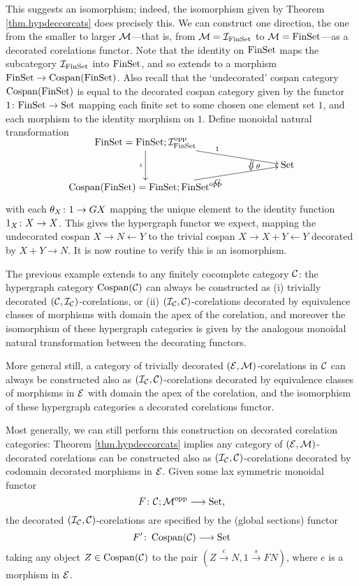 \begin{example}
  This suggests an isomorphism; indeed, the isomorphism given by Theorem
  \ref{thm.hypdeccorcats} does precisely this. We can construct one direction,
  the one from the smaller to larger $\mathcal M$---that is, from $\mathcal M = \mathcal
  I_{\mathrm{FinSet}}$ to $\mathcal M = \mathrm{FinSet}$---as a decorated corelations
  functor.  Note that the identity on $\mathrm{FinSet}$ maps the subcategory $\mathcal
  I_{\mathrm{FinSet}}$ into $\mathrm{FinSet}$, and so extends to a morphism $\mathrm{FinSet} \to
  \operatorname{{Cospan}}(\mathrm{FinSet})$. Also recall that the `undecorated' cospan category
  $\operatorname{{Cospan}}(\mathrm{FinSet})$ is equal to the decorated cospan category given by the
  functor $1{\colon} \mathrm{FinSet} \to \mathrm{Set}$ mapping each finite set to some chosen one
  element set $1$, and each morphism to the identity morphism on $1$. Define
  monoidal natural transformation 
  \[
    \xymatrixrowsep{2ex}
    \xymatrix{
      \FinSet = \FinSet; \mc I_{\FinSet}^\opp \ar[dd]_{\iota} \ar[drr]^1  \\
      &\twocell \omit{_\:\theta}& \Set \\
      \cospan(\FinSet) = \FinSet; \FinSet^\opp \ar[urr]_{G} 
    }
  \]
  with each $\theta_X {\colon} 1 \to GX$ mapping the unique element to the identity
  function $1_X{\colon} X \to X$.  This gives the hypergraph functor we expect,
  mapping the undecorated cospan $X \to N \leftarrow Y$ to the trivial cospan $X
  \to X+Y \leftarrow Y$ decorated by $X+Y \to N$. It is now routine to verify
  this is an isomorphism.
\end{example}

The previous example extends to any finitely cocomplete category $\mathcal C$: the
hypergraph category $\operatorname{{Cospan}}(\mathcal C)$ can always be constructed as (i)
trivially decorated $(\mathcal C, \mathcal I_{\mathcal C})$-corelations, or (ii) $(\mathcal I_{\mathcal
C}, \mathcal C)$-corelations decorated by equivalence classes of morphisms with
domain the apex of the corelation, and moreover the isomorphism of these
hypergraph categories is given by the analogous monoidal natural transformation
between the decorating functors.

More general still, a category of trivially decorated $(\mathcal E, \mathcal
M)$-corelations in $\mathcal C$ can always be constructed also as $(\mathcal I_{\mathcal C},
\mathcal C)$-corelations decorated by equivalence classes of morphisms in $\mathcal E$
with domain the apex of the corelation, and the isomorphism of these
hypergraph categories a decorated corelations functor.

Most generally, we can still perform this construction on decorated corelation
categories: Theorem \ref{thm.hypdeccorcats} implies any category of $(\mathcal E,\mathcal
M)$-decorated corelations can be constructed also as $(\mathcal I_{\mathcal C}, \mathcal
C)$-corelations decorated by codomain decorated morphisms in $\mathcal E$. Given some
lax symmetric monoidal functor
\[
  F{\colon} \mathcal C;\mathcal M^{\mathrm{opp}} \longrightarrow \mathrm{Set},
\]
the decorated $(\mathcal I_{\mathcal C}, \mathcal C)$-corelations are specified by the (global
sections) functor
\[
  F'{\colon} \operatorname{{Cospan}}(\mathcal C) \longrightarrow \mathrm{Set}
\]
taking any object $Z \in \operatorname{{Cospan}}(\mathcal C)$ to the pair $(Z \stackrel{e}\to N,
1\stackrel{s}\to FN)$, where $e$ is a morphism in $\mathcal E$.

